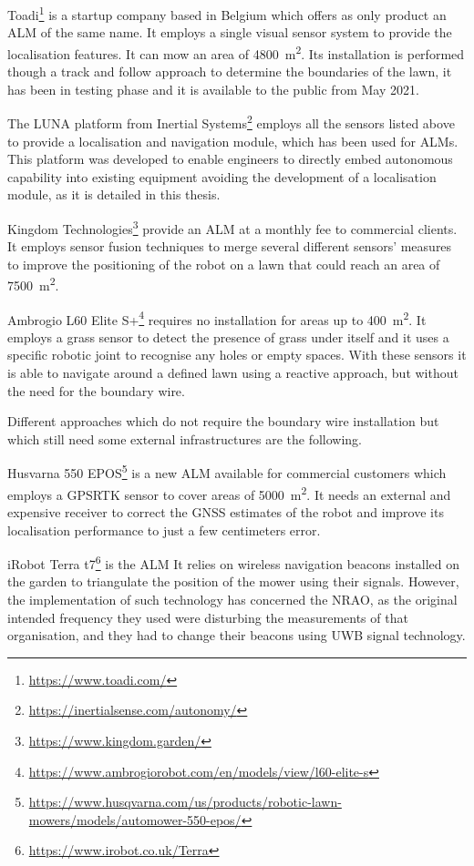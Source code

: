 Toadi\footnote{\url{https://www.toadi.com/}} is a startup company based in Belgium which offers as only product an \gls{ALM} of the same name. It employs a single visual sensor system to provide the localisation features. It can mow an area of \SI{4800}{\meter\squared}.
Its installation is performed though a track and follow approach to determine the boundaries of the lawn, it has been in testing phase and it is available to the public from May 2021.

The LUNA platform from Inertial Systems\footnote{\url{https://inertialsense.com/autonomy/}} employs all the sensors listed above to provide a localisation and navigation module, which has been used for \glspl{ALM}. This platform was developed to enable engineers to directly embed autonomous capability into existing equipment avoiding the development of a localisation module, as it is detailed in this thesis.

Kingdom Technologies\footnote{\url{https://www.kingdom.garden/}} provide an \gls{ALM} at a monthly fee to commercial clients.
It employs sensor fusion techniques to merge several different sensors' measures to improve the positioning of the robot on a lawn that could reach an area of \SI{7500}{\meter\squared}.

Ambrogio L60 Elite S+\footnote{\url{https://www.ambrogiorobot.com/en/models/view/l60-elite-s}} requires no installation for areas up to \SI{400}{\meter\squared}.
It employs a grass sensor to detect the presence of grass under itself and it uses a specific robotic joint to recognise any holes or empty spaces. With these sensors it is able to navigate around a defined lawn using a reactive approach, but without the need for the boundary wire.

Different approaches which do not require the boundary wire installation but which still need some external infrastructures are the following.

Husvarna 550 EPOS\footnote{\url{https://www.husqvarna.com/us/products/robotic-lawn-mowers/models/automower-550-epos/}} is a new \gls{ALM} available for commercial customers which employs a \gls{GPSRTK} sensor to cover areas of \SI{5000}{\meter\squared}. It needs an external and expensive receiver to correct the \gls{GNSS} estimates of the robot and improve its localisation performance to just a few centimeters error.

iRobot Terra t7\footnote{\url{https://www.irobot.co.uk/Terra}} is the \gls{ALM}
It relies on wireless navigation beacons installed on the garden to triangulate the position of the mower using their signals. However, the implementation of such technology has concerned the \gls{NRAO}, as the original intended frequency they used were disturbing the measurements of that organisation, and they had to change their beacons using \gls{UWB} signal technology.

